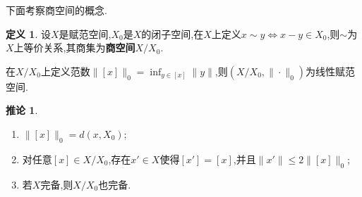 \documentclass{ctexart}
\theoremstyle{definition}
\newtheorem{definition}{定义}
\newtheorem{corollary}{推论}
\theoremstyle{remark}
\begin{document}
	下面考察商空间的概念.
	\begin{definition}
		设$X$是赋范空间,$X_0$是$X$的闭子空间,在$X$上定义$x\sim y\Leftrightarrow x-y\in X_0$,则$\sim$为$X$上等价关系,其商集为\textbf{商空间}$X/X_0$.
		
		在$X/X_0$上定义范数$\|[x]\|_0=\inf_{y\in[x]}{\|y\|}$,则$(X/X_0,\|\cdot\|_0)$为线性赋范空间.
	\end{definition}
	\begin{corollary}
		\begin{enumerate}
			\item $\|[x]\|_0=d(x,X_0)$;
			\item 对任意$[x]\in X/X_0$,存在$x'\in X$使得$[x']=[x]$,并且$\|x'\|\le 2\|[x]\|_0$;
			\item 若$X$完备,则$X/X_0$也完备.
		\end{enumerate}
	\end{corollary}
	
\end{document}
